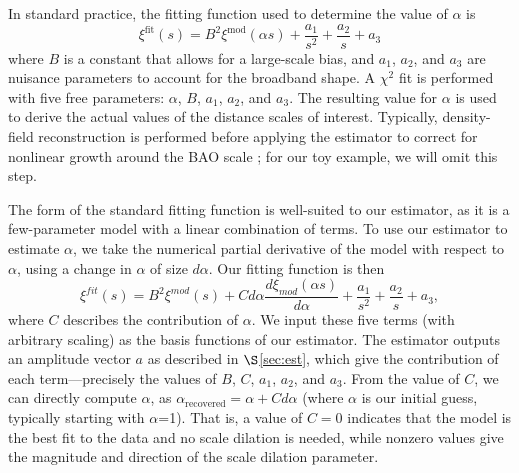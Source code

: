 \documentclass[modern]{aastex62}
\begin{document}

In standard practice, the fitting function used to determine the value of $\alpha$ is
\begin{equation}
\xi^{\text{fit}}(s) = B^2 \xi^{\text{mod}}(\alpha s) + \frac{a_1}{s^2} + \frac{a_2}{s} + a_3
\end{equation}
where $B$ is a constant that allows for a large-scale bias, and $a_1$, $a_2$, and $a_3$ are nuisance parameters to account for the broadband shape.
A $\chi^2$ fit is performed with five free parameters: $\alpha$, $B$, $a_1$, $a_2$, and $a_3$.
The resulting value for $\alpha$ is used to derive the actual values of the distance scales of interest.
Typically, density-field reconstruction is performed before applying the estimator to correct for nonlinear growth around the BAO scale \citep{Eisenstein2007}; for our toy example, we will omit this step.

The form of the standard fitting function is well-suited to our estimator, as it is a few-parameter model with a linear combination of terms.
To use our estimator to estimate $\alpha$, we take the numerical partial derivative of the model with respect to $\alpha$, using a change in $\alpha$ of size $d\alpha$.
Our fitting function is then
\begin{equation} \label{eq:baoiter_fit}
\xi^{fit}(s) = B^2 \xi^{mod}(s) + C d\alpha\frac{d\xi_{mod}(\alpha s)}{d\alpha} + \frac{a_1}{s^2} + \frac{a_2}{s} + a_3,
\end{equation}
where $C$ describes the contribution of $\alpha$.
We input these five terms (with arbitrary scaling) as the basis functions of our estimator.
The estimator outputs an amplitude vector $a$ as described in $\S$\ref{sec:est}, which give the contribution of each term---precisely the values of $B$, $C$, $a_1$, $a_2$, and $a_3$.
From the value of $C$, we can directly compute $\alpha$, as $\alpha_{\text{recovered}} =  \alpha + Cd\alpha$ (where $\alpha$ is our initial guess, typically starting with  $\alpha$=1). 
That is, a value of $C=0$ indicates that the model is the best fit to the data and no scale dilation is needed, while nonzero values give the magnitude and direction of the scale dilation parameter.
\end{document}
